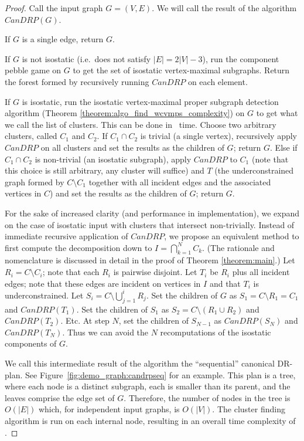 \begin{proof}
    Call the input graph $G=(V,E)$. We will call the result of the algorithm $CanDRP(G)$.

    If $G$ is a single edge, return $G$.

    If $G$ is not isostatic (i.e.\ does not satisfy $|E|=2|V|-3$), run the component pebble game on $G$ to get the set of isostatic vertex-maximal subgraphs. Return the forest formed by recursively running $CanDRP$ on each element.

    If $G$ is isostatic, run the isostatic vertex-maximal proper subgraph detection algorithm (Theorem \ref{theorem:algo_find_wcvmps_complexity}) on $G$ to get what we call the list of clusters. This can be done in \complexityAllClustersV\ time. Choose two arbitrary clusters, called $C_1$ and $C_2$. If $C_1\cap C_2$ is trivial (a single vertex), recursively apply $CanDRP$ on all clusters and set the results as the children of $G$; return $G$. Else if $C_1\cap C_2$ is non-trivial (an isostatic subgraph), apply $CanDRP$ to $C_1$ (note that this choice is still arbitrary, any cluster will suffice) and $T$ (the underconstrained graph formed by $C\setminus C_1$ together with all incident edges and the associated vertices in $C$) and set the results as the children of $G$; return $G$.

    For the sake of increased clarity (and performance in implementation), we expand on the case of isostatic input with clusters that intersect non-trivially. Instead of immediate recursive application of $CanDRP$, we propose an equivalent method to first compute the decomposition down to $I=\bigcap_{k=1}^{N}{C_k}$. (The rationale and nomenclature is discussed in detail in the proof of Theorem \ref{theorem:main}.) Let $R_i= C\setminus C_i$; note that each $R_i$ is pairwise disjoint. Let $T_i$ be $R_i$ plus all incident edges; note that these edges are incident on vertices in $I$ and that $T_i$ is underconstrained. Let $S_i = C\setminus \bigcup_{j=1}^{i}{R_j}$. Set the children of $G$ as $S_1=C\setminus R_1=C_1$ and $CanDRP(T_1)$. Set the children of $S_1$ as $S_2=C\setminus (R_1\cup R_2)$ and $CanDRP(T_2)$. Etc. At step $N$, set the children of $S_{N-1}$ as $CanDRP(S_N)$ and $CanDRP(T_N)$. Thus we can avoid the $N$ recomputations of the isostatic components of $G$.

    We call this intermediate result of the algorithm the ``sequential'' canonical DR-plan. See Figure~\ref{fig:demo_graph:candrpseq} for an example. This plan is a tree, where each node is a distinct subgraph, each is smaller than its parent, and the leaves comprise the edge set of $G$. Therefore, the number of nodes in the tree is $O(|E|)$ which, for independent input graphs, is $O(|V|)$. The cluster finding algorithm is run on each internal node, resulting in an overall time complexity of \ComplexityCanDRPV.


\end{proof}
